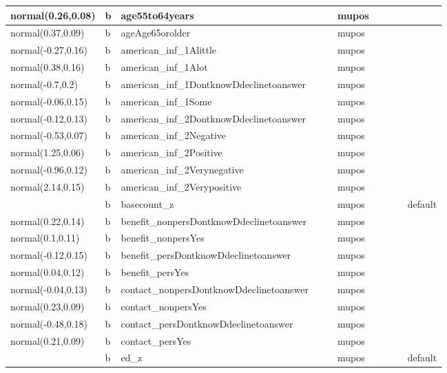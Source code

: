 \documentclass[
]{book}
\theoremstyle{definition}
\theoremstyle{definition}
\theoremstyle{definition}
\theoremstyle{definition}
\theoremstyle{remark}
\begin{document}
\begin{table}
\begin{tabular}[t]{l|l|l|l|l|l|l|l|l|l}
\hline
normal(0.26,0.08) & b & age55to64years &  &  & mupos &  &  &  & \\
\hline
normal(0.37,0.09) & b & ageAge65orolder &  &  & mupos &  &  &  & \\
\hline
normal(-0.27,0.16) & b & american\_inf\_1Alittle &  &  & mupos &  &  &  & \\
\hline
normal(0.38,0.16) & b & american\_inf\_1Alot &  &  & mupos &  &  &  & \\
\hline
normal(-0.7,0.2) & b & american\_inf\_1DontknowDdeclinetoanswer &  &  & mupos &  &  &  & \\
\hline
normal(-0.06,0.15) & b & american\_inf\_1Some &  &  & mupos &  &  &  & \\
\hline
normal(-0.12,0.13) & b & american\_inf\_2DontknowDdeclinetoanswer &  &  & mupos &  &  &  & \\
\hline
normal(-0.53,0.07) & b & american\_inf\_2Negative &  &  & mupos &  &  &  & \\
\hline
normal(1.25,0.06) & b & american\_inf\_2Positive &  &  & mupos &  &  &  & \\
\hline
normal(-0.96,0.12) & b & american\_inf\_2Verynegative &  &  & mupos &  &  &  & \\
\hline
normal(2.14,0.15) & b & american\_inf\_2Verypositive &  &  & mupos &  &  &  & \\
\hline
 & b & basecount\_z &  &  & mupos &  &  &  & default\\
\hline
normal(0.22,0.14) & b & benefit\_nonpersDontknowDdeclinetoanswer &  &  & mupos &  &  &  & \\
\hline
normal(0.1,0.11) & b & benefit\_nonpersYes &  &  & mupos &  &  &  & \\
\hline
normal(-0.12,0.15) & b & benefit\_persDontknowDdeclinetoanswer &  &  & mupos &  &  &  & \\
\hline
normal(0.04,0.12) & b & benefit\_persYes &  &  & mupos &  &  &  & \\
\hline
normal(-0.04,0.13) & b & contact\_nonpersDontknowDdeclinetoanswer &  &  & mupos &  &  &  & \\
\hline
normal(0.23,0.09) & b & contact\_nonpersYes &  &  & mupos &  &  &  & \\
\hline
normal(-0.48,0.18) & b & contact\_persDontknowDdeclinetoanswer &  &  & mupos &  &  &  & \\
\hline
normal(0.21,0.09) & b & contact\_persYes &  &  & mupos &  &  &  & \\
\hline
 & b & ed\_z &  &  & mupos &  &  &  & default\\

\end{tabular}
\end{table}
\end{document}
